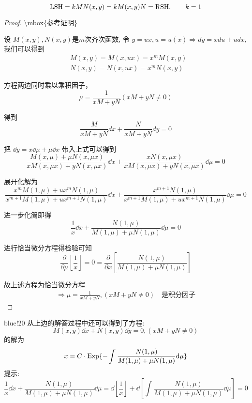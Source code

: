 \[
    {\rm LSH} = k M N(x, y) = k M(x, y) N = {\rm RSH}, \qquad k = 1
\]

\begin{proof}\num{\mbox{参考证明}}

设 $M(x, y), N(x, y)$是$m$次齐次函数, 令 $y = ux, u = u(x) \Rightarrow dy = xdu + u dx$, 我们可以得到
\begin{align*}
    & M(x, y) = M (x, ux) = x^m M(x, y)\\
    & N(x, y) = N (x, ux) = x^m N(x, y)   
\end{align*}

方程两边同时乘以乘积因子， 
\[
    \mu  = \frac{1}{xM +yN}(xM + yN \neq 0)
\]

得到
\[
    \frac{M}{xM + yN} dx + \frac{N}{xM + yN}dy = 0
\]

把 $\dd y = x\dd\mu  + \mu \dd x$ 带入上式可以得到
\[
    \frac{M(x,\mu)+ \mu N(x, \mu x)}{xM(x, \mu x)+ yN(x, \mu x)}\dd x + \frac{xN(x, \mu x)}{xM(x, \mu x)+ yN(x, \mu x)}\dd\mu = 0
\]

展开化解为
\[
    \frac{x^m M(1, \mu)+ ux^m N(1, \mu)}{x^{m+1} M(1, \mu)+ ux^{m+1} N(1, \mu)}\dd x + \frac{x^{m +1} N(1, \mu )}{x^{m+1} M(1, \mu)+ ux^{m+1} N(1, \mu )}\dd\mu = 0
\]

进一步化简即得
\[
    \frac{1}{x}\dd x + \frac{N(1, \mu)}{M(1, \mu)+ \mu N(1, \mu)}\dd \mu = 0
\]

进行恰当微分方程得检验可知
\[
    \frac{\partial }{\partial \mu} \left[\frac{1}{x}\right] = 0 = \frac{\partial }{\partial x}\left[\frac{N(1, \mu)}{M(1, \mu)+ \mu N(1, \mu)}\right]    
\]

故上述方程为恰当微分方程
\begin{align*}
   \Longrightarrow \mu  = \frac{1}{xM +yN},(xM + yN \neq 0)\quad\text{是积分因子}
\end{align*} 
\end{proof}

\begin{formal}{blue!20}
    从上边的解答过程中还可以得到了方程: 
    \[
        M(x, y)\dd x + N(x, y)\dd y=0, (xM+ yN \neq 0)
    \]
    的解为
    \[
        x = C\cdot{\rm Exp}\{-\int_{}^{}{\frac{N(1, \mu)}{M(1, \mu)+ \mu N(1, \mu)}\mathrm{d} \mu}\}
    \]
    提示:
    \[
        \frac{1}{x}\dd x + \frac{N(1, \mu)}{M(1, \mu)+ \mu N(1, \mu)}\dd \mu = \dd\left[\frac{1}{x}\right] + \dd\left[\int_{}^{}{\frac{N(1, \mu)}{M(1, \mu)+ \mu N(1, \mu)} \dd \mu}\right] = 0
    \]   
\end{formal}
